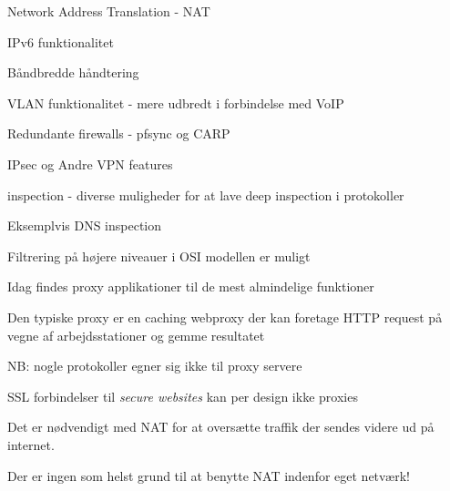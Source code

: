 \documentclass[Screen16to9,17pt]{foils}
\begin{document}




\begin{list2}
\item Network Address Translation - NAT
\item IPv6 funktionalitet

\item Båndbredde håndtering
\item VLAN funktionalitet - mere udbredt i forbindelse med VoIP
\item Redundante firewalls - pfsync og CARP
\item IPsec og Andre VPN features
\item inspection - diverse muligheder for at lave deep inspection i protokoller
\item Eksemplvis DNS inspection
\end{list2}


\begin{list1}
\item Filtrering på højere niveauer i OSI modellen er muligt
\item Idag findes proxy applikationer til de mest almindelige
  funktioner
\item Den typiske proxy er en caching webproxy der kan foretage HTTP
  request på vegne af arbejdsstationer og gemme resultatet
\item NB: nogle protokoller egner sig ikke til proxy servere
\item SSL forbindelser til \emph{secure websites} kan per design ikke proxies
\end{list1}



\begin{list1}
\item Det er nødvendigt med NAT for at oversætte traffik der sendes videre
ud på internet.
\vskip 1cm
\item Der er ingen som helst grund til at benytte NAT indenfor eget netværk!
\end{list1}


\end{document}
